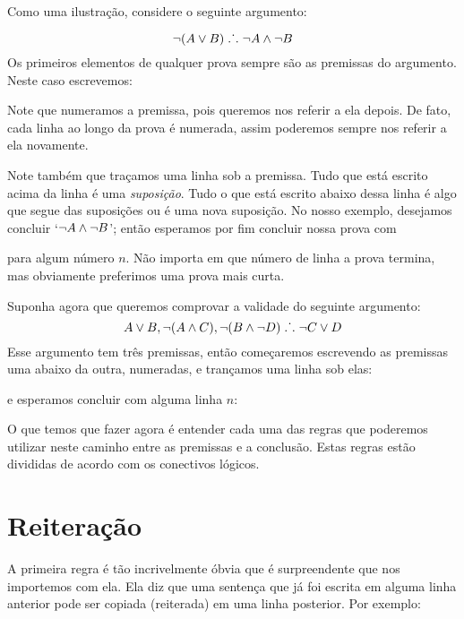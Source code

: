 Como uma ilustração, considere o seguinte argumento: 
 
	$$\neg (A \vee B) \mathrel{\ldotp\dot{}\,\ldotp} \neg A \wedge \neg B$$
Os primeiros elementos de qualquer prova sempre são as premissas do argumento. Neste caso escrevemos: 
\begin{fitchproof}
\end{fitchproof}
 
Note que numeramos a premissa, pois queremos nos referir  a ela depois. De fato, cada  linha  ao longo da prova  é numerada, assim poderemos sempre nos referir a ela novamente. 

 Note também que traçamos  uma linha sob a  premissa. Tudo que está escrito acima da linha é uma 
\emph{suposição}. Tudo o que está escrito abaixo dessa linha é algo que segue das suposições ou é uma nova suposição. No nosso exemplo, desejamos concluir 
 `$\neg A \wedge \neg B$';  então esperamos por fim concluir nossa prova com
\begin{fitchproof}
\end{fitchproof}
para algum número $n$. Não importa em que número de linha a prova termina, mas obviamente preferimos uma prova mais curta. 

Suponha agora que queremos comprovar a validade do seguinte argumento:
$$A\vee B, \neg (A\wedge C), \neg (B \wedge \neg D) \mathrel{\ldotp\dot{}\,\ldotp} \neg C\vee D$$
Esse argumento tem três premissas, então  começaremos escrevendo as premissas uma abaixo da outra, numeradas, e trançamos uma linha sob elas: 
\begin{fitchproof}
\end{fitchproof}
e esperamos concluir com alguma linha $n$:
\begin{fitchproof}
\end{fitchproof}
  O que temos que fazer agora é entender cada uma das regras que poderemos utilizar neste caminho entre as premissas e a conclusão. Estas regras estão divididas de acordo com os conectivos lógicos. 

\section{Reiteração}
 A primeira regra é tão incrivelmente óbvia que é surpreendente que nos importemos com ela.  Ela diz que uma sentença que já foi escrita em alguma linha anterior pode ser copiada (reiterada) em uma linha posterior. Por exemplo:

